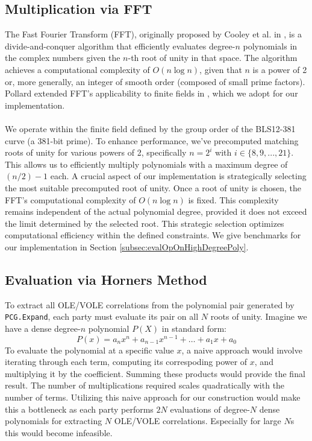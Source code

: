 \subsection{Multiplication via FFT}
\label{subsec:multviaFFT}
The Fast Fourier Transform (FFT), originally proposed by Cooley et al. in \cite{cooley1965algorithm}, is a divide-and-conquer algorithm that efficiently evaluates degree-$n$ polynomials in the complex numbers given the $n$-th root of unity in that space. The algorithm achieves a computational complexity of $O(n\log n)$, given that $n$ is a power of 2 or, more generally, an integer of smooth order (composed of small prime factors). Pollard extended FFT's applicability to finite fields in \cite{pollard1971fast}, which we adopt for our implementation. 
\\\\
We operate within the finite field defined by the group order of the BLS12-381 curve (a 381-bit prime). To enhance performance, we've precomputed matching roots of unity for various powers of 2, specifically $n=2^i$ with $i \in \{8, 9, ..., 21\}$. This allows us to efficiently multiply polynomials with a maximum degree of $(n/2)-1$ each. A crucial aspect of our implementation is strategically selecting the most suitable precomputed root of unity. Once a root of unity is chosen, the FFT's computational complexity of $O(n \log n)$ is fixed. This complexity remains independent of the actual polynomial degree, provided it does not exceed the limit determined by the selected root. This strategic selection optimizes computational efficiency within the defined constraints. We give benchmarks for our implementation in Section \ref{subsec:evalOpOnHighDegreePoly}.

\subsection{Evaluation via Horners Method}
\label{subsec:horner}
To extract all OLE/VOLE correlations from the polynomial pair generated by \texttt{PCG.Expand}, each party must evaluate its pair on all $N$ roots of unity. Imagine we have a dense degree-$n$ polynomial $P(X)$ in standard form:
$$
P(x) = a_n x^n + a_{n-1} x^{n-1} + \dots + a_1 x + a_0
$$
To evaluate the polynomial at a specific value $x$, a naive approach would involve iterating through each term, computing its correspoding power of $x$, and multiplying it by the coefficient. Summing these products would provide the final result. The number of multiplications required scales quadratically with the number of terms. Utilizing this naive approach for our construction would make this a bottleneck as each party performs $2N$ evaluations of degree-$N$ dense polynomials for extracting $N$ OLE/VOLE correlations. Especially for large $N$s this would become infeasible.

